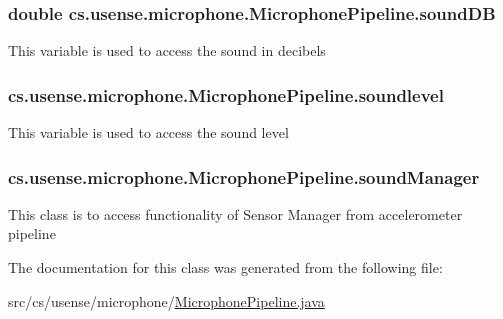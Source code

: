 \subsubsection[{sound\+D\+B}]{\setlength{\rightskip}{0pt plus 5cm}double cs.\+usense.\+microphone.\+Microphone\+Pipeline.\+sound\+D\+B\hspace{0.3cm}{\ttfamily [protected]}}\label{classcs_1_1usense_1_1microphone_1_1_microphone_pipeline_afa11d6538443e5f38bee7f74af2e12a3}
This variable is used to access the sound in decibels \hypertarget{classcs_1_1usense_1_1microphone_1_1_microphone_pipeline_ac5246bcde0eda6ad83d282e324ba0a2a}{}
\subsubsection[{soundlevel}]{ cs.\+usense.\+microphone.\+Microphone\+Pipeline.\+soundlevel\hspace{0.3cm}{\ttfamily [private]}}\label{classcs_1_1usense_1_1microphone_1_1_microphone_pipeline_ac5246bcde0eda6ad83d282e324ba0a2a}
This variable is used to access the sound level \hypertarget{classcs_1_1usense_1_1microphone_1_1_microphone_pipeline_a25e3b63425e7205555b7db7a0ad21781}{}
\subsubsection[{sound\+Manager}]{ cs.\+usense.\+microphone.\+Microphone\+Pipeline.\+sound\+Manager\hspace{0.3cm}{\ttfamily [private]}}\label{classcs_1_1usense_1_1microphone_1_1_microphone_pipeline_a25e3b63425e7205555b7db7a0ad21781}
This class is to access functionality of Sensor Manager from accelerometer pipeline 

The documentation for this class was generated from the following file\+:\begin{DoxyCompactItemize}
\item 
src/cs/usense/microphone/\hyperlink{_microphone_pipeline_8java}{Microphone\+Pipeline.\+java}\end{DoxyCompactItemize}

